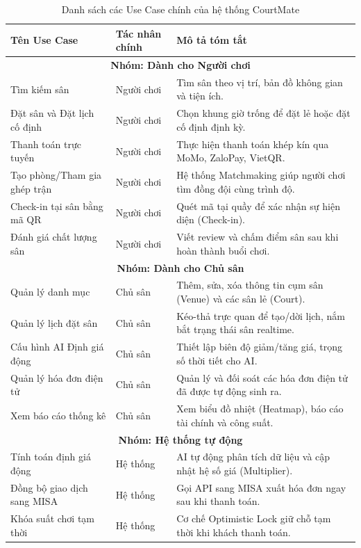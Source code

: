 \begin{table}[H]
    \centering
    \renewcommand{\arraystretch}{1.4}
    \begin{tabular}{|p{4.5cm}|p{3cm}|p{7.5cm}|}
        \hline
        \textbf{Tên Use Case} & \textbf{Tác nhân chính} & \textbf{Mô tả tóm tắt} \\
        \hline
        \multicolumn{3}{|c|}{\textbf{Nhóm: Dành cho Người chơi}} \\
        \hline
        Tìm kiếm sân & Người chơi & Tìm sân theo vị trí, bản đồ không gian và tiện ích. \\
        \hline
        Đặt sân và Đặt lịch cố định & Người chơi & Chọn khung giờ trống để đặt lẻ hoặc đặt cố định định kỳ. \\
        \hline
        Thanh toán trực tuyến & Người chơi & Thực hiện thanh toán khép kín qua MoMo, ZaloPay, VietQR. \\
        \hline
        Tạo phòng/Tham gia ghép trận & Người chơi & Hệ thống Matchmaking giúp người chơi tìm đồng đội cùng trình độ. \\
        \hline
        Check-in tại sân bằng mã QR & Người chơi & Quét mã tại quầy để xác nhận sự hiện diện (Check-in). \\
        \hline
        Đánh giá chất lượng sân & Người chơi & Viết review và chấm điểm sân sau khi hoàn thành buổi chơi. \\
        \hline
        \multicolumn{3}{|c|}{\textbf{Nhóm: Dành cho Chủ sân}} \\
        \hline
        Quản lý danh mục & Chủ sân & Thêm, sửa, xóa thông tin cụm sân (Venue) và các sân lẻ (Court). \\
        \hline
        Quản lý lịch đặt sân & Chủ sân & Kéo-thả trực quan để tạo/dời lịch, nắm bắt trạng thái sân realtime. \\
        \hline
        Cấu hình AI Định giá động & Chủ sân & Thiết lập biên độ giảm/tăng giá, trọng số thời tiết cho AI. \\
        \hline
        Quản lý hóa đơn điện tử & Chủ sân & Quản lý và đối soát các hóa đơn điện tử đã được tự động sinh ra. \\
        \hline
        Xem báo cáo thống kê & Chủ sân & Xem biểu đồ nhiệt (Heatmap), báo cáo tài chính và công suất. \\
        \hline
        \multicolumn{3}{|c|}{\textbf{Nhóm: Hệ thống tự động}} \\
        \hline
        Tính toán định giá động & Hệ thống & AI tự động phân tích dữ liệu và cập nhật hệ số giá (Multiplier). \\
        \hline
        Đồng bộ giao dịch sang MISA & Hệ thống & Gọi API sang MISA xuất hóa đơn ngay sau khi thanh toán. \\
        \hline
        Khóa suất chơi tạm thời & Hệ thống & Cơ chế Optimistic Lock giữ chỗ tạm thời khi khách thanh toán. \\
        \hline
    \end{tabular}
    \caption{Danh sách các Use Case chính của hệ thống CourtMate}
    \label{tab:usecase_list}
\end{table}

